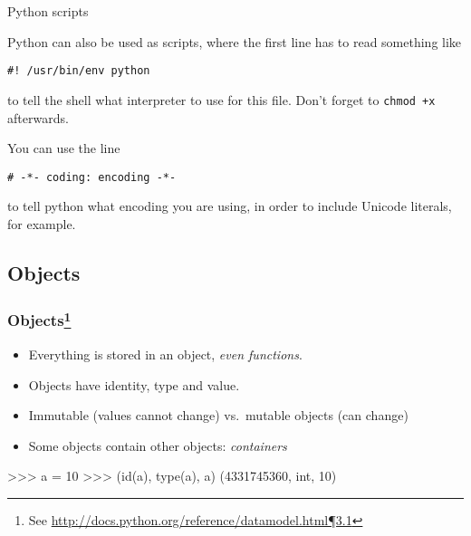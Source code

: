 \documentclass[xetex,10pt]{beamer}
\def\spacer{\vspace*{1em}}
\begin{document}
\begin{frame}[fragile]{Python scripts}
	
	Python can also be used as scripts, where the first line has to read something like
	
\begin{verbatim}
#! /usr/bin/env python
\end{verbatim}
	
	to tell the shell what interpreter to use for this file. Don't forget to \verb!chmod +x! afterwards.\\

	\pause
	\spacer

	You can use the line

\begin{verbatim}
# -*- coding: encoding -*-
\end{verbatim}

	to tell python what encoding you are using, in order to include Unicode literals, for example.

\end{frame}


\subsection{Objects}

\begin{frame}[fragile]
	\frametitle{Objects\footnote[frame]{See \href{http://docs.python.org/reference/datamodel.html\#objects-values-and-types}{http://docs.python.org/reference/datamodel.html¶3.1}}}

	\begin{itemize}
		\item Everything is stored in an object, \emph{even functions}.
		\pause
		\item Objects have identity, type and value.
		\pause
		\item Immutable (values cannot change) vs.\ mutable objects (can change)
		\pause
		\item Some objects contain other objects: \emph{containers}
	\end{itemize}
	
	\spacer
	
	\begin{python}
	>>> a = 10
	>>> (id(a), type(a), a)
	(4331745360, int, 10)
	\end{python}

\end{frame}
\end{document}
